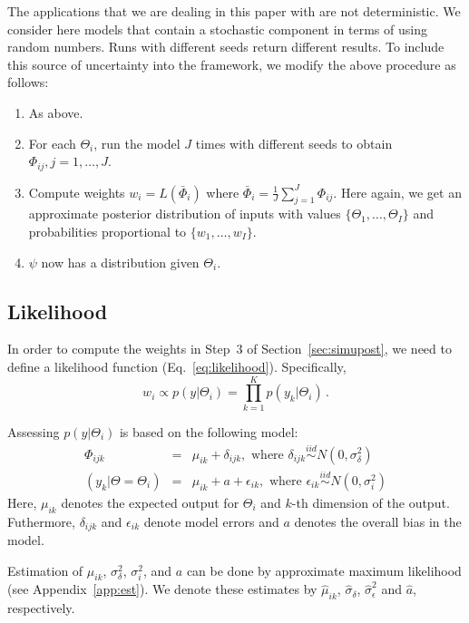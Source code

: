 \documentclass[11pt, fleqn]{article}
\begin{document}
The applications that we are dealing in this paper with are not
deterministic. We consider here models that contain a stochastic component in
terms of using random numbers. Runs with different seeds return different
results. To include this source of uncertainty into the framework, we modify
the above procedure as follows:

\begin{enumerate}
\item As above.
\item  For each $\Theta_i$, run the model $J$ times with different seeds to
  obtain $\Phi_{ij}, j=1,\ldots,J$.
\item Compute weights $w_i = L(\bar{\Phi}_{i})$ where
  $\bar{\Phi}_{i}=\frac{1}{J}\sum_{j=1}^J \Phi_{ij}$. Here again, we get an
  approximate posterior distribution of inputs with values
  $\{\Theta_1,\dots,\Theta_I\}$ and probabilities proportional to
  $\{w_1,\dots,w_I\}$.
\item $\psi$ now has a distribution given $\Theta_i$.
\end{enumerate}


\subsection{Likelihood}
%
In order to compute the weights in Step~3 of Section~\ref{sec:simupost}, we
need to define a likelihood function (Eq.~\ref{eq:likelihood}). Specifically,
\begin{equation}
w_i \propto p(y|\Theta_i) = \prod_{k=1}^K p(y_k | \Theta_i)\,.
\end{equation}

Assessing $p(y|\Theta_i)$ is based on the following model:
\begin{eqnarray}
\Phi_{ijk} & = & \mu_{ik} + \delta_{ijk}, \text{ where } \delta_{ijk}
\stackrel{iid}{\sim} N(0,\sigma_{\delta}^2) \label{eq:phi}\\
(y_{k}|\Theta=\Theta_i) & = & \mu_{ik} + a + \epsilon_{ik}, \text{ where } \epsilon_{ik}\stackrel{iid}{\sim} N(0,\sigma_{i}^2)\label{eq:y}
\end{eqnarray}
Here, $\mu_{ik}$ denotes the expected output for $\Theta_i$ and $k$-th
dimension of the output. Futhermore, $\delta_{ijk}$ and $\epsilon_{ik}$ denote
model errors and $a$ denotes the overall bias in the model.

Estimation of $\mu_{ik}$, $\sigma_{\delta}^2$, $\sigma_{i}^2$, and $a$
can be done by approximate maximum likelihood (see Appendix~\ref{app:est}). We
denote these estimates by $\hat{\mu}_{ik}$, $\hat{\sigma}_{\delta}$,
$\hat{\sigma}_{\epsilon}^2$ and $\hat{a}$, respectively.
\end{document}

